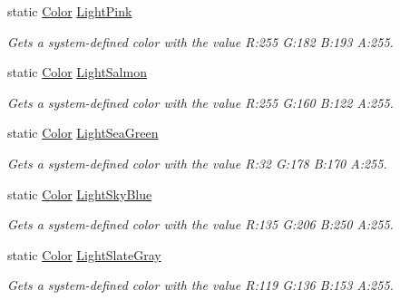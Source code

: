 \begin{DoxyCompactItemize}
static \hyperlink{struct_microsoft_1_1_xna_1_1_framework_1_1_color}{Color} \hyperlink{struct_microsoft_1_1_xna_1_1_framework_1_1_color_aa2e4979eb77512e63d03c1d7eb0bf5bd}{Light\+Pink}
\begin{DoxyCompactList}\small\item\em Gets a system-\/defined color with the value R\+:255 G\+:182 B\+:193 A\+:255.\end{DoxyCompactList}\item 
static \hyperlink{struct_microsoft_1_1_xna_1_1_framework_1_1_color}{Color} \hyperlink{struct_microsoft_1_1_xna_1_1_framework_1_1_color_aff5463b8edf260c1a394e25c062803e0}{Light\+Salmon}
\begin{DoxyCompactList}\small\item\em Gets a system-\/defined color with the value R\+:255 G\+:160 B\+:122 A\+:255.\end{DoxyCompactList}\item 
static \hyperlink{struct_microsoft_1_1_xna_1_1_framework_1_1_color}{Color} \hyperlink{struct_microsoft_1_1_xna_1_1_framework_1_1_color_a112891fab4400aa63529cf28672ddf96}{Light\+Sea\+Green}
\begin{DoxyCompactList}\small\item\em Gets a system-\/defined color with the value R\+:32 G\+:178 B\+:170 A\+:255.\end{DoxyCompactList}\item 
static \hyperlink{struct_microsoft_1_1_xna_1_1_framework_1_1_color}{Color} \hyperlink{struct_microsoft_1_1_xna_1_1_framework_1_1_color_afa29d2bb1c50583876b10bf8a71d7945}{Light\+Sky\+Blue}
\begin{DoxyCompactList}\small\item\em Gets a system-\/defined color with the value R\+:135 G\+:206 B\+:250 A\+:255.\end{DoxyCompactList}\item 
static \hyperlink{struct_microsoft_1_1_xna_1_1_framework_1_1_color}{Color} \hyperlink{struct_microsoft_1_1_xna_1_1_framework_1_1_color_ab93db9880b3eabff5ed29efe8301a65e}{Light\+Slate\+Gray}
\begin{DoxyCompactList}\small\item\em Gets a system-\/defined color with the value R\+:119 G\+:136 B\+:153 A\+:255.\end{DoxyCompactList}\item 

\end{DoxyCompactItemize}
